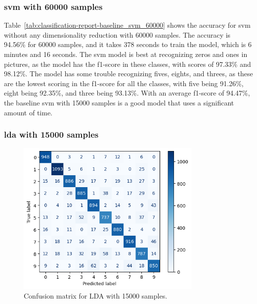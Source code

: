\subsubsection{\gls{svm} with 60000 samples}\label{subsubsec:experiment-1-results-svm-60000}

Table~\ref{tab:classification-report-baseline_svm_60000} shows the accuracy for \gls{svm} without any dimensionality reduction with 60000 samples. The accuracy is 94.56\% for 60000 samples, and it takes 378 seconds to train the model, which is 6 minutes and 16 seconds. The \gls{svm} model is best at recognizing zeros and ones in pictures, as the model has the f1-score in these classes, with scores of 97.33\% and 98.12\%. The model has some trouble recognizing fives, eights, and threes, as these are the lowest scoring in the f1-score for all the classes, with five being 91.26\%, eight being 92.35\%, and three being 93.13\%. With an average f1-score of 94.47\%, the baseline \gls{svm} with 15000 samples is a good model that uses a significant amount of time.

\subsubsection{\gls{lda} with 15000 samples}\label{subsubsec:experiment-1-results-lda-15000}




\begin{figure}[htb!]
    \centering
    \includegraphics[width=0.8\textwidth]{figures/1-experiment/confusion_matrix_lda_svm_15000.png}
    \caption{Confusion matrix for LDA with 15000 samples.}
    \label{fig:confusion-matrix-lda-15000}
\end{figure}

